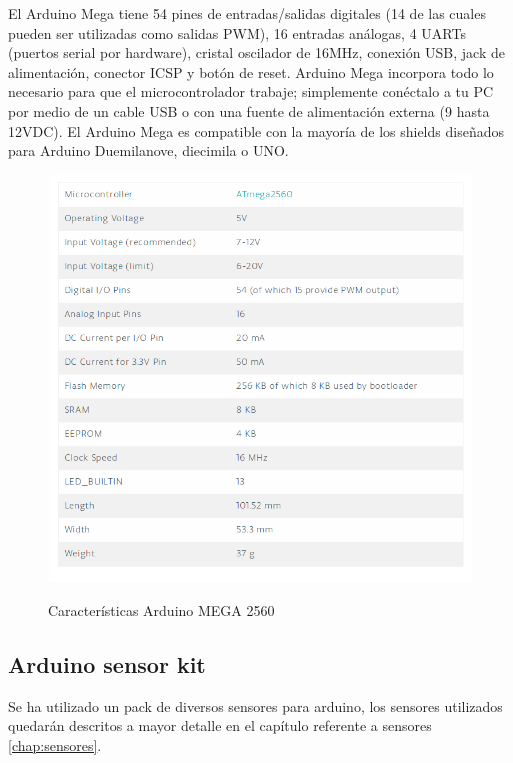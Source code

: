 El Arduino Mega tiene 54 pines de entradas/salidas digitales (14 de las cuales pueden ser utilizadas como salidas PWM), 16 entradas análogas, 4 UARTs (puertos serial por
hardware), cristal oscilador de 16MHz, conexión USB, jack de alimentación, conector ICSP y botón de reset.  Arduino Mega incorpora todo lo necesario para que el microcontrolador
trabaje; simplemente conéctalo a tu PC por medio de un cable USB o con una fuente de alimentación externa (9 hasta 12VDC). El Arduino Mega es compatible con la mayoría de los 
shields diseñados para Arduino Duemilanove, diecimila o UNO.

\begin{figure}[H]
  \begin{center}
    \includegraphics[scale=0.5]{imagenes/arduino_caracteristicas.png}\\
    \caption{Características Arduino MEGA 2560}
  \end{center}
\end{figure}


\subsection {Arduino sensor kit}

Se ha utilizado un pack de diversos sensores para arduino, los sensores utilizados quedarán descritos a mayor detalle en el capítulo referente a sensores \ref{chap:sensores}.

